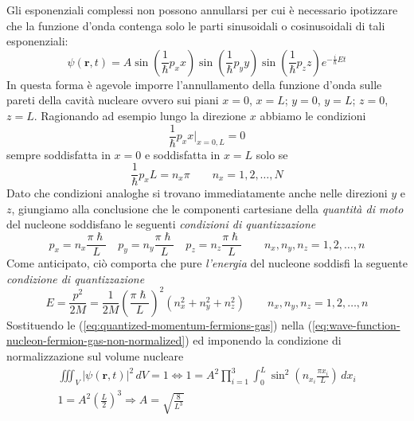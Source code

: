 Gli esponenziali complessi non possono annullarsi per cui è necessario ipotizzare che la funzione d’onda contenga solo le parti sinusoidali o cosinusoidali di tali esponenziali:
\begin{equation}
	\psi(\bm{r},t) = A \sin\left(  \frac{1}{\hslash}p_{x}x \right) \sin\left(  \frac{1}{\hslash}p_{y}y \right) \sin\left(  \frac{1}{\hslash}p_{z}z \right) e^{ - \frac{i}{\hslash}Et }
	\label{eq:wave-function-nucleon-fermion-gas-non-normalized}
\end{equation}
In questa forma è agevole imporre l’annullamento della funzione d’onda sulle pareti della cavità nucleare ovvero sui piani $x=0$, $x=L$;  $y=0$, $y=L$; $z=0$, $z=L$.
Ragionando ad esempio lungo la direzione $x$ abbiamo le condizioni
\[
\frac{1}{\hslash} p_{x}x \big|_{x = 0,L} = 0
\]
sempre soddisfatta in $x=0$ e soddisfatta in $x=L$ solo se
\[
\frac{1}{\hslash}p_{x}L = n_{x} \pi \qquad n_{x} = 1,2, \dots, N
\]
Dato che condizioni analoghe si trovano immediatamente anche nelle direzioni $y$ e $z$, giungiamo alla conclusione che
le componenti cartesiane della \emph{quantità di moto} del nucleone soddisfano le seguenti \emph{condizioni di quantizzazione}
\begin{equation}
	p_{x} = n_{x} \frac{\pi \hslash}{L} \quad
	p_{y} = n_{y} \frac{\pi \hslash}{L} \quad
	p_{z} = n_{z} \frac{\pi \hslash}{L} \qquad
	n_{x},n_{y},n_{z} = 1,2, \dots , n
	\label{eq:quantized-momentum-fermions-gas}
\end{equation}
Come anticipato, ciò comporta che pure \emph{l’energia} del nucleone soddisfi la seguente \emph{condizione di quantizzazione}
\begin{equation}
	E = \frac{p^{2}}{2 M} = \frac{1}{2 M} \left( \frac{\pi \hslash}{L} \right)^{2} (n_{x}^{2} + n_{y}^{2}+n_{z}^{2}) \qquad
	n_{x},n_{y},n_{z} = 1,2, \dots , n
	\label{eq:energy-nucleon-fermions-gas}
\end{equation}
Sostituendo le (\ref{eq:quantized-momentum-fermions-gas}) nella (\ref{eq:wave-function-nucleon-fermion-gas-non-normalized})
ed imponendo la condizione di normalizzazione sul volume nucleare
\begin{gather*}
    \iiint_{V} |\psi(\bm{r},t) |^{2} \, dV = 1 \iff
1 = A^{2} \prod_{i = 1}^{3} \int_{0}^{L} \sin ^{2}\left( n_{x_{i}} \frac{\pi x_{i}}{L} \right) \, dx_{i}\\
    1 = A^{2} \left( \frac{L}{2} \right)^{3} \Longrightarrow A = \sqrt{ \frac{8}{L^{3}} }
\end{gather*}
